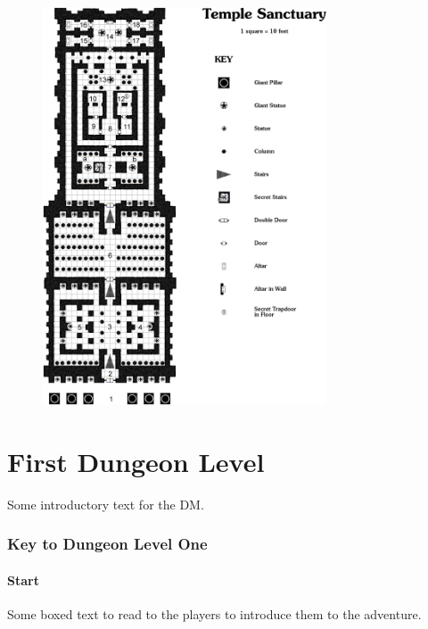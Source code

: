\documentclass[letterpaper,serif]{module}
\begin{document}
\begin{figure}[p]
\centering
\includegraphics[width=0.75\textwidth]{module_map.png}
\vspace{2em}
\label{img:map}
\end{figure}

\part{First Dungeon Level}

Some introductory text for the DM.

\section*{Key to Dungeon Level One}

\subsection*{Start}

\begin{boxtext}
Some boxed text to read to the players to introduce them to the adventure.
\end{boxtext}
\end{document}
